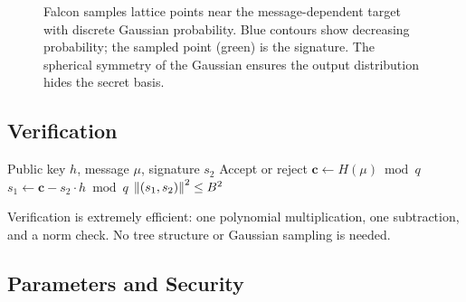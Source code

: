 \begin{figure}[t]
\centering
{}
\caption{Falcon samples lattice points near the message-dependent target with discrete Gaussian probability.  Blue contours show decreasing probability; the sampled point (green) is the signature.  The spherical symmetry of the Gaussian ensures the output distribution hides the secret basis.}
\label{fig:ch08-falcon-gaussian}
\end{figure}

\subsection{Verification}
\label{subsec:falcon-verify}

\begin{algorithm}[t]
\caption{Falcon $\Verify$}
\label{alg:falcon-verify}
\begin{algorithmic}[1]
\Require Public key $h$, message $\mu$, signature $s_2$
\Ensure Accept or reject
\State $\mathbf{c} \gets H(\mu) \bmod q$
\State $s_1 \gets \mathbf{c} - s_2 \cdot h \bmod q$
\State \Return $\left\lVert (s_1, s_2) \right\rVert^2 \leq B^2$
\end{algorithmic}
\end{algorithm}

Verification is extremely efficient: one polynomial multiplication, one subtraction, and a norm check.  No tree structure or Gaussian sampling is needed.

\subsection{Parameters and Security}
\label{subsec:falcon-params}

